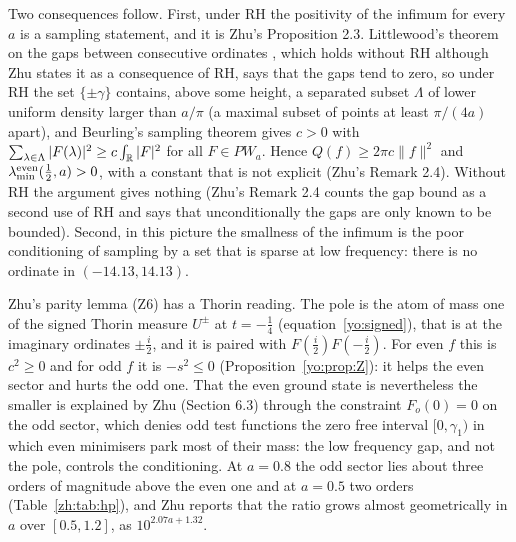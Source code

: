 Two consequences follow. First, under RH the positivity of the infimum for every $a$ is a sampling statement, and it is Zhu's Proposition 2.3. Littlewood's theorem on the gaps between consecutive ordinates \cite[Section~9.12]{Titchmarsh}, which holds without RH although Zhu states it as a consequence of RH, says that the gaps tend to zero, so under RH the set $\{\pm\gamma\}$ contains, above some height, a separated subset $\Lambda$ of lower uniform density larger than $a/\pi$ (a maximal subset of points at least $\pi/(4a)$ apart), and Beurling's sampling theorem \cite[Chapters 2 and 3]{Seip04} gives $c>0$ with $\sum_{\lambda\in\Lambda}|F(\lambda)|^2\ge c\int_{\mathbb{R}}|F|^2$ for all $F\in PW_a$. Hence $Q(f)\ge2\pi c\|f\|^2$ and $\lambda^{\rm even}_{\min}(\frac12,a)>0$, with a constant that is not explicit (Zhu's Remark 2.4). Without RH the argument gives nothing (Zhu's Remark 2.4 counts the gap bound as a second use of RH and says that unconditionally the gaps are only known to be bounded). Second, in this picture the smallness of the infimum is the poor conditioning of sampling by a set that is sparse at low frequency: there is no ordinate in $(-14.13,14.13)$.

Zhu's parity lemma (Z6) has a Thorin reading. The pole is the atom of mass one of the signed Thorin measure $U^\pm$ at $t=-\frac14$ (equation~\eqref{yo:signed}), that is at the imaginary ordinates $\pm\frac i2$, and it is paired with $F(\frac i2)F(-\frac i2)$. For even $f$ this is $c^2\ge0$ and for odd $f$ it is $-s^2\le0$ (Proposition~\ref{yo:prop:Z}): it helps the even sector and hurts the odd one. That the even ground state is nevertheless the smaller is explained by Zhu (Section 6.3) through the constraint $F_o(0)=0$ on the odd sector, which denies odd test functions the zero free interval $[0,\gamma_1)$ in which even minimisers park most of their mass: the low frequency gap, and not the pole, controls the conditioning. At $a=0.8$ the odd sector lies about three orders of magnitude above the even one and at $a=0.5$ two orders (Table~\ref{zh:tab:hp}), and Zhu reports that the ratio grows almost geometrically in $a$ over $[0.5,1.2]$, as $10^{2.07a+1.32}$.

